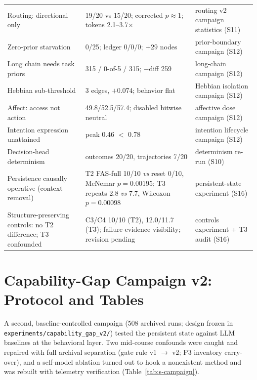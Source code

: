 \documentclass[10pt,a4paper]{article}
\begin{document}
\begin{table}[h]
\begin{tabular}{L{4.6cm}L{4.6cm}L{5.6cm}}
Routing: directional only & 19/20 vs 15/20; corrected $p{\approx}1$; tokens 2.1--3.7$\times$ & routing v2 campaign statistics (S11) \\
Zero-prior starvation & 0/25; ledger 0/0/0; $+29$ nodes & prior-boundary campaign (S12) \\
Long chain needs task priors & 315 / 0-of-5 / 315; $-$diff 259 & long-chain campaign (S12) \\
Hebbian sub-threshold & 3 edges, $+0.074$; behavior flat & Hebbian isolation campaign (S12) \\
Affect: access not action & 49.8/52.5/57.4; disabled bitwise neutral & affective dose campaign (S12) \\
Intention expression unattained & peak 0.46 $<$ 0.78 & intention lifecycle campaign (S12) \\
Decision-head determinism & outcomes 20/20, trajectories 7/20 & determinism re-run (S10) \\
Persistence causally operative (context removal) & T2 FAS-full 10/10 \emph{vs} reset 0/10, McNemar $p{=}0.00195$; T3 repeats 2.8 \emph{vs} 7.7, Wilcoxon $p{=}0.00098$ & persistent-state experiment (S16) \\
Structure-preserving controls: no T2 difference; T3 confounded & C3/C4 10/10 (T2), 12.0/11.7 (T3); failure-evidence visibility; revision pending & controls experiment + T3 audit (S16) \\
\bottomrule
\end{tabular}
\end{table}


\section{Capability-Gap Campaign v2: Protocol and Tables}
\label{s15:campaign}

A second, baseline-controlled campaign (508 archived runs; design frozen in
\texttt{experiments/capability\_gap\_v2/}) tested the persistent state
against LLM baselines at the behavioral layer. Two mid-course confounds
were caught and repaired with full archival separation (gate rule v1
$\rightarrow$ v2; P3 inventory carry-over), and a self-model ablation
turned out to hook a nonexistent method and was rebuilt with telemetry
verification (Table~\ref{tab:s-campaign}).
\end{document}
